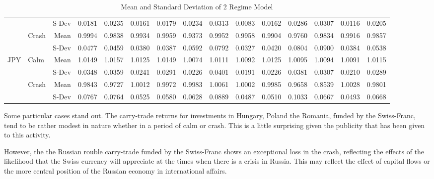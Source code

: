 \documentclass[12pt, a4paper, oneside]{article} %
\begin{document}
\begin{landscape}
\begin{table}[ht]
\begin{tabular}{llrrrrrrrrrrrrr}
   & & S-Dev & 0.0181 & 0.0235 & 0.0161 & 0.0179 & 0.0234 & 0.0313 & 0.0083 & 0.0162 & 0.0286 & 0.0307 & 0.0116 & 0.0205 \\ 
   & \multirow{2}{*}{Crash}& Mean & 0.9994 & 0.9838 & 0.9934 & 0.9959 & 0.9373 & 0.9952 & 0.9958 & 0.9904 & 0.9760 & 0.9834 & 0.9916 & 0.9857 \\ 
  & & S-Dev & 0.0477 & 0.0459 & 0.0380 & 0.0387 & 0.0592 & 0.0792 & 0.0327 & 0.0420 & 0.0804 & 0.0900 & 0.0384 & 0.0538 \\ 
\hline  
  \multirow{4}{*}{JPY}&\multirow{2}{*}{Calm}& Mean& 1.0149 & 1.0157 & 1.0125 & 1.0149 & 1.0074 & 1.0111 & 1.0092 & 1.0125 & 1.0095 & 1.0094 & 1.0091 & 1.0115 \\ 
 & & S-Dev &0.0348 & 0.0359 & 0.0241 & 0.0291 & 0.0226 & 0.0401 & 0.0191 & 0.0226 & 0.0381 & 0.0307 & 0.0210 & 0.0289 \\ 
  & \multirow{2}{*}{Crash}&Mean & 0.9843 & 0.9727 & 1.0012 & 0.9972 & 0.9983 & 1.0061 & 1.0002 & 0.9985 & 0.9658 & 0.8539 & 1.0028 & 0.9801 \\ 
  & & S-Dev& 0.0767 & 0.0764 & 0.0525 & 0.0580 & 0.0628 & 0.0889 & 0.0487 & 0.0510 & 0.1033 & 0.0667 & 0.0493 & 0.0668 \\ 
   \hline
\end{tabular}
\caption{Mean and Standard Deviation of 2 Regime Model}
\end{table}
\label{tabref:2StateProb}
\end{landscape}

Some particular cases stand out. The carry-trade returns for investments in Hungary, Poland the Romania, funded by the Swiss-Franc, tend to be rather modest in nature whether in a period of calm or crash. This is a little surprising given the publicity that has been given to this activity.  

However, the the Russian rouble carry-trade funded by the Swiss-Franc shows an exceptional loss in the crash, reflecting the effects of the likelihood that the Swiss currency will appreciate at the times when there is a crisis in Russia.  This may reflect the effect of capital flows or the more central position of the Russian economy in international affairs. 
 
 
 
\end{document}
